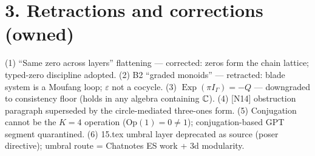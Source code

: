 \documentclass[10pt]{article}
\begin{document}
\section*{3. Retractions and corrections (owned)}
(1) ``Same zero across layers'' flattening --- corrected: zeros form the chain lattice; typed-zero discipline adopted. (2) B2 ``graded monoids'' --- retracted: blade system is a Moufang loop; $\varepsilon$ not a cocycle. (3) $\operatorname{Exp}(\pi I_\Gamma)=-Q$ --- downgraded to consistency floor (holds in any algebra containing $\mathbb C$). (4) [N14] obstruction paragraph superseded by the circle-mediated three-ones form. (5) Conjugation cannot be the $K{=}4$ operation ($\mathrm{Op}(1)=0\neq1$); conjugation-based GPT segment quarantined. (6) 15.tex umbral layer deprecated as source (poser directive); umbral route = Chatnotes ES work + 3d modularity.
\end{document}
